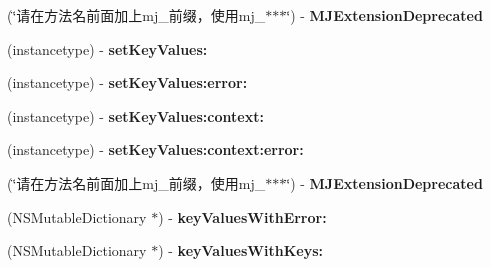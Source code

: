 \begin{DoxyCompactItemize}
(\char`\"{}请在方法名前面加上mj\+\_\+前缀，使用mj\+\_\+$\ast$$\ast$$\ast$\char`\"{}) -\/ {\bfseries M\+J\+Extension\+Deprecated}
\item 
\mbox{\label{category_n_s_object_07_m_j_key_value_deprecated__v__2__5__16_08_aa1e138aa5532c51815221a7d3cfc8e79}} 
(instancetype) -\/ {\bfseries set\+Key\+Values\+:}
\item 
\mbox{\label{category_n_s_object_07_m_j_key_value_deprecated__v__2__5__16_08_a72b875dc325817dfd48f7a55f822a9cb}} 
(instancetype) -\/ {\bfseries set\+Key\+Values\+:error\+:}
\item 
\mbox{\label{category_n_s_object_07_m_j_key_value_deprecated__v__2__5__16_08_ab16ec482aaab7c49340165d68ab5c299}} 
(instancetype) -\/ {\bfseries set\+Key\+Values\+:context\+:}
\item 
\mbox{\label{category_n_s_object_07_m_j_key_value_deprecated__v__2__5__16_08_a471180608d7720d4a810577546843d7a}} 
(instancetype) -\/ {\bfseries set\+Key\+Values\+:context\+:error\+:}
\item 
\mbox{\label{category_n_s_object_07_m_j_key_value_deprecated__v__2__5__16_08_a6da7166fe843e9d1c5173a744acbbb3f}} 
(\char`\"{}请在方法名前面加上mj\+\_\+前缀，使用mj\+\_\+$\ast$$\ast$$\ast$\char`\"{}) -\/ {\bfseries M\+J\+Extension\+Deprecated}
\item 
\mbox{\label{category_n_s_object_07_m_j_key_value_deprecated__v__2__5__16_08_aa53bf0f37329bae3c86c04194d18d057}} 
(N\+S\+Mutable\+Dictionary $\ast$) -\/ {\bfseries key\+Values\+With\+Error\+:}
\item 
\mbox{\label{category_n_s_object_07_m_j_key_value_deprecated__v__2__5__16_08_a415d6cad8e34fb8c754e81c71991924a}} 
(N\+S\+Mutable\+Dictionary $\ast$) -\/ {\bfseries key\+Values\+With\+Keys\+:}
\item 

\end{DoxyCompactItemize}
